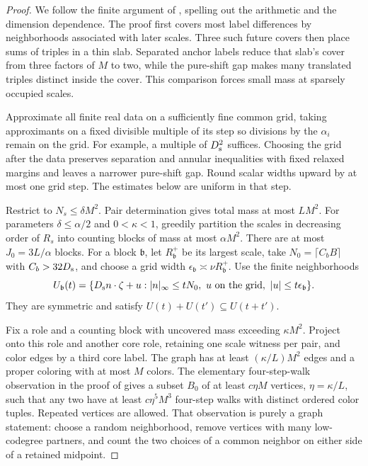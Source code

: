 \begin{proof}
We follow the finite argument of \cite[Lemma~9.1]{H}, spelling out
the arithmetic and the dimension dependence.  The proof first covers
most label differences by neighborhoods associated with later scales.
Three such future covers then place sums of triples in a thin slab.
Separated anchor labels reduce that slab's cover from three factors
of \(M\) to two, while the pure-shift gap makes many translated
triples distinct inside the cover.  This comparison forces small
mass at sparsely occupied scales.

Approximate all finite
real data on a sufficiently fine common grid, taking approximants
on a fixed divisible multiple of its step so divisions by the
\(\alpha_i\) remain on the grid.  For example, a multiple of
\(D_{\rm s}^2\) suffices.  Choosing the grid after the data preserves
separation and annular inequalities with fixed relaxed margins and
leaves a narrower pure-shift gap.  Round scalar widths upward by at
most one grid step.  The estimates below are uniform in that step.

Restrict to \(N_s\le\delta M^2\).  Pair determination gives total
mass at most \(LM^2\).  For parameters \(\delta\le\alpha/2\)
and \(0<\kappa<1\), greedily partition the scales in decreasing
order of \(R_s\) into counting blocks of mass at most
\(\alpha M^2\).  There are at most \(J_0=3L/\alpha\) blocks.
For a block \(\mathfrak b\), let \(R_{\mathfrak b}^+\) be its
largest scale, take \(N_0=\lceil C_bB\rceil\) with
\(C_b>32D_{\rm s}\), and choose a grid width
\(\epsilon_{\mathfrak b}\asymp\nu R_{\mathfrak b}^+\).
Use the finite neighborhoods
\[
 U_{\mathfrak b}(t)=
 \{D_{\rm s}n\cdot\zeta+u:
 |n|_\infty\le tN_0,\ u\text{ on the grid},\
 |u|\le t\epsilon_{\mathfrak b}\}.
\]
They are symmetric and satisfy
\(U(t)+U(t')\subseteq U(t+t')\).

Fix a role and a counting block with uncovered mass exceeding
\(\kappa M^2\).  Project onto this role and another core role,
retaining one scale witness per pair, and color edges by a third
core label.  The graph has at least \((\kappa/L)M^2\) edges and
a proper coloring with at most \(M\) colors.  The elementary
four-step-walk observation in the proof of \cite[Lemma~9.1]{H}
gives a subset \(B_0\) of at least \(c\eta M\) vertices,
\(\eta=\kappa/L\), such that any two have at least
\(c\eta^5M^3\) four-step walks with distinct ordered color tuples.
Repeated vertices are allowed.
That observation is purely a graph statement: choose a random
neighborhood, remove vertices with many low-codegree partners, and
count the two choices of a common neighbor on either side of a
retained midpoint.


\end{proof}
